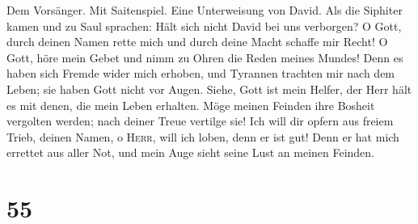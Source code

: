  Dem Vorsänger. Mit Saitenspiel. Eine Unterweisung von
David. Als die Siphiter kamen und zu Saul sprachen: Hält sich nicht
David bei uns verborgen? O Gott, durch deinen Namen rette mich und durch
deine Macht schaffe mir Recht!  O Gott, höre mein Gebet
und nimm zu Ohren die Reden meines Mundes!  Denn es haben
sich Fremde wider mich erhoben, und Tyrannen trachten mir nach dem
Leben; sie haben Gott nicht vor Augen.  Siehe, Gott ist
mein Helfer, der Herr hält es mit denen, die mein Leben erhalten.
 Möge meinen Feinden ihre Bosheit vergolten werden; nach
deiner Treue vertilge sie!  Ich will dir opfern aus freiem
Trieb, deinen Namen, o \textsc{Herr}, will ich loben, denn er ist gut!
 Denn er hat mich errettet aus aller Not, und mein Auge
sieht seine Lust an meinen Feinden.

\hypertarget{section-54}{%
\section{55}\label{section-54}}


